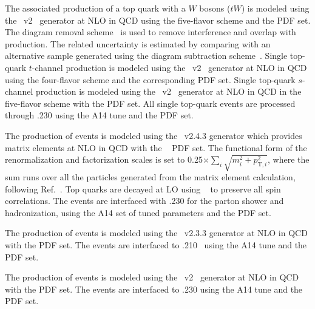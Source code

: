 The associated production of a top quark with a $W$ bosons ($tW$) is modeled using the \powhegbox~v2~\cite{Re:2010bp,Nason:2004rx,Frixione:2007vw,Alioli:2010xd} generator at NLO in QCD using the five-flavor scheme and the \nnpdfnlo PDF set.
The diagram removal scheme~\cite{Frixione:2008yi} is used to remove interference and overlap with \ttbar production.
The related uncertainty is estimated by comparing with an alternative sample generated using the diagram subtraction scheme~\cite{Frixione:2008yi,ATL-PHYS-PUB-2016-020}.
Single top-quark $t$-channel production is modeled using the \powhegbox~v2~\cite{Frederix:2012dh,Nason:2004rx,Frixione:2007vw,Alioli:2010xd} generator at NLO in QCD using the four-flavor scheme and the corresponding \nnpdfnlo PDF set.
Single top-quark $s$-channel production is modeled using the \powhegbox~v2~\cite{Alioli:2009je,Nason:2004rx,Frixione:2007vw,Alioli:2010xd} generator at NLO in QCD in the five-flavor scheme with the \nnpdfnlo PDF set.
All single top-quark events are processed through \pythia.230 using the A14 tune and the \nnpdftwo PDF set.

The production of \tttt events is modeled using the \mgamc~v2.4.3 generator which provides matrix elements at NLO in QCD with the \nnpdfonenlo~\cite{Ball:2014uwa} PDF set.
The functional form of the renormalization and factorization scales is set to 0.25$\times \sum_i \sqrt{m^2_i+p^2_{\text{T},i}}$, where the sum runs over all the particles generated from the matrix element calculation, following Ref.~\cite{Frederix:2017wme}.
Top quarks are decayed at LO using \madspin~\cite{Frixione:2007zp,Artoisenet:2012st} to preserve all spin correlations.
The events are interfaced with \pythia.230 for the parton shower and hadronization, using the A14 set of tuned parameters and the \nnpdftwo PDF set.

The production of \ttV events is modeled using the \mgamc~v2.3.3 generator at NLO in QCD with the \nnpdfnlo PDF set.
The events are interfaced to \pythia.210~ using the A14 tune and the \nnpdftwo PDF set.

The production of \ttH events is modeled using the \powhegbox~v2~\cite{Frixione:2007nw,Nason:2004rx,Frixione:2007vw,Alioli:2010xd,Hartanto:2015uka} generator at NLO in QCD with the \nnpdfnlo PDF set.
The events are interfaced to \pythia.230 using the A14 tune and the \nnpdftwo PDF set.

